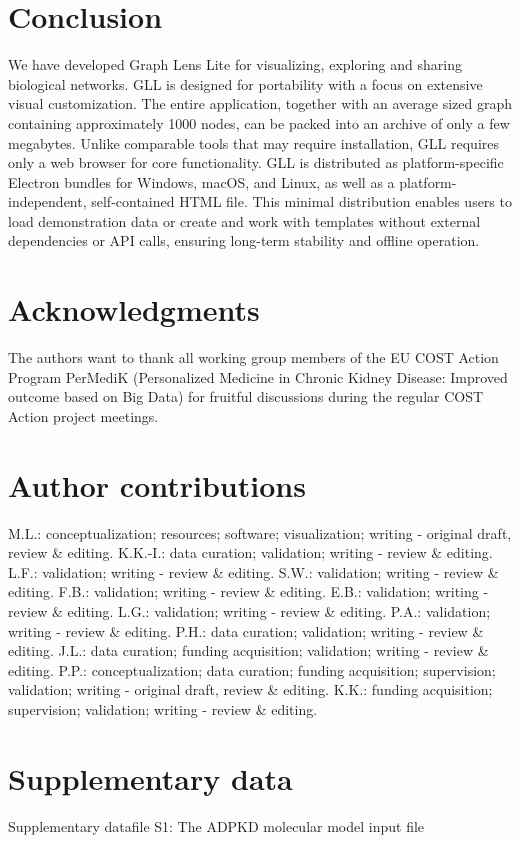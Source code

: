 \section{Conclusion}
We have developed Graph Lens Lite for visualizing, exploring and sharing biological networks. GLL is designed for portability with a focus on extensive visual customization. The entire application, together with an average sized graph containing approximately 1000 nodes, can be packed into an archive of only a few megabytes. Unlike comparable tools that may require installation, GLL requires only a web browser for core functionality. GLL is distributed as platform-specific Electron bundles for Windows, macOS, and Linux, as well as a platform-independent, self-contained HTML file. This minimal distribution enables users to load demonstration data or create and work with templates without external dependencies or API calls, ensuring long-term stability and offline operation.

\section*{Acknowledgments}
The authors want to thank all working group members of the EU COST Action Program PerMediK (Personalized Medicine in Chronic Kidney Disease: Improved outcome based on Big Data) for fruitful discussions during the regular COST Action project meetings.

\section*{Author contributions}
M.L.: conceptualization; resources; software; visualization; writing - original draft, review \& editing. K.K.-I.: data curation; validation; writing - review \& editing. L.F.: validation; writing - review \& editing. S.W.: validation; writing - review \& editing. F.B.: validation; writing - review \& editing. E.B.: validation; writing - review \& editing. L.G.: validation; writing - review \& editing. P.A.: validation; writing - review \& editing. P.H.: data curation; validation; writing - review \& editing. J.L.: data curation; funding acquisition; validation; writing - review \& editing. P.P.: conceptualization; data curation; funding acquisition; supervision; validation; writing - original draft, review \& editing. K.K.: funding acquisition; supervision; validation; writing - review \& editing.

\section*{Supplementary data}
Supplementary datafile S1: The ADPKD molecular model input file

